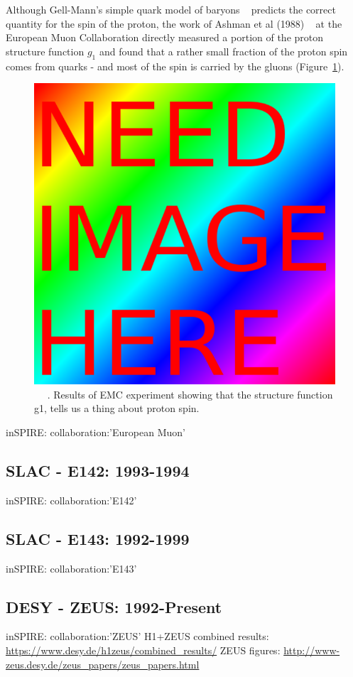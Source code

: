 Although Gell-Mann's simple quark model of baryons ~\cite{Gell-Mann1961}
predicts the correct quantity for the spin of the proton, the work of Ashman et
al (1988) ~\needcite{} at the European Muon Collaboration directly measured a
portion of the proton structure function $g_1$ and found that a rather small
fraction of the proton spin comes from quarks - and most of the spin is carried
by the gluons (Figure~\ref{fig:emc_g1_result}).

\begin{figure}[ht]
	\begin{center}
		\includegraphics[width=0.5\linewidth]{figures/filler/squareimg.png}
		\caption{
			~\needfig{} ~\needcap{}. Results of EMC experiment showing that the
			structure function g1, tells us a thing about proton spin.
		}
		\label{fig:emc_g1_result}
	\end{center}
\end{figure}

inSPIRE: collaboration:'European Muon'

\subsection{SLAC - E142: 1993-1994}
inSPIRE: collaboration:'E142'

\subsection{SLAC - E143: 1992-1999} 
inSPIRE: collaboration:'E143'

\subsection{DESY - ZEUS: 1992-Present}
inSPIRE: collaboration:'ZEUS'
H1+ZEUS combined results: \url{https://www.desy.de/h1zeus/combined_results/}
ZEUS figures: \url{http://www-zeus.desy.de/zeus_papers/zeus_papers.html}

